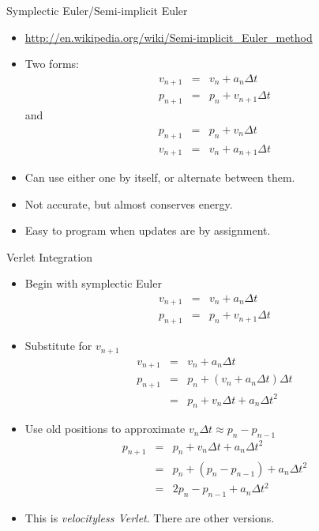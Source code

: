 \documentclass[handout,t,compress]{beamer}
\newcommand{\bframe}[1]{\begin{frame}[fragile]{#1}}
\begin{document}
\bframe{Symplectic Euler/Semi-implicit Euler}
\begin{itemize}
\item \url{http://en.wikipedia.org/wiki/Semi-implicit_Euler_method}
\item Two forms:
\begin{eqnarray*}
v_{n+1} &=& v_{n} + a_{n}\Delta t\\
p_{n+1} &=& p_{n} + v_{n+1}\Delta t
\end{eqnarray*}
and
\begin{eqnarray*}
p_{n+1} &=& p_{n} + v_{n}\Delta t\\
v_{n+1} &=& v_{n} + a_{n+1}\Delta t
\end{eqnarray*}
\item Can use either one by itself, or alternate between them.
\item Not accurate, but almost conserves energy.
\item Easy to program when updates are by assignment.
\end{itemize}
\end{frame}

\bframe{Verlet Integration}
\begin{itemize}
\item Begin with symplectic Euler
\begin{eqnarray*}
v_{n+1} &=& v_{n} + a_{n}\Delta t\\
p_{n+1} &=& p_{n} + v_{n+1}\Delta t
\end{eqnarray*}
\item Substitute for $v_{n+1}$
\begin{eqnarray*}
v_{n+1} &=& v_{n} + a_{n}\Delta t\\
p_{n+1} &=& p_{n} + (v_{n} + a_{n}\Delta t)\Delta t\\
       &=& p_{n} + v_{n}\Delta t + a_{n}\Delta t^2
\end{eqnarray*}
\item Use old positions to approximate $v_n\Delta t \approx p_n - p_{n-1}$
\begin{eqnarray*}
p_{n+1} &=& p_{n} + v_{n}\Delta t + a_{n}\Delta t^2\\
       &=& p_{n} + (p_{n} - p_{n-1}) + a_{n}\Delta t^2\\
       &=& 2p_{n} - p_{n-1} + a_{n}\Delta t^2
\end{eqnarray*}
\item This is {\em velocityless Verlet}.  There are other versions.
\end{itemize}
\end{frame}
\end{document}

